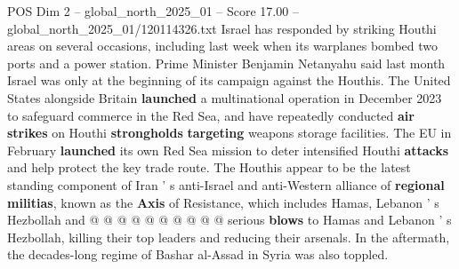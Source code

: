 \begin{textsample}{POS Dim 2 – global\_north\_2025\_01 – Score 17.00 – global\_north\_2025\_01/120114326.txt}
Israel has responded by striking Houthi areas on several occasions, including last week when its warplanes bombed two ports and a power station.
Prime Minister Benjamin Netanyahu said last month Israel was only at the beginning of its campaign against the Houthis.
The United States alongside Britain \textbf{launched} a multinational operation in December 2023 to safeguard commerce in the Red Sea, and have repeatedly conducted \textbf{air} \textbf{strikes} on Houthi \textbf{strongholds} \textbf{targeting} weapons storage facilities.
The EU in February \textbf{launched} its own Red Sea mission to deter intensified Houthi \textbf{attacks} and help protect the key trade route.
The Houthis appear to be the latest standing component of Iran ' s anti-Israel and anti-Western alliance of \textbf{regional} \textbf{militias}, known as the \textbf{Axis} of Resistance, which includes Hamas, Lebanon ' s Hezbollah and @ @ @ @ @ @ @ @ @ @ serious \textbf{blows} to Hamas and Lebanon ' s Hezbollah, killing their top leaders and reducing their arsenals.
In the aftermath, the decades-long regime of Bashar al-Assad in Syria was also toppled.

\end{textsample}
